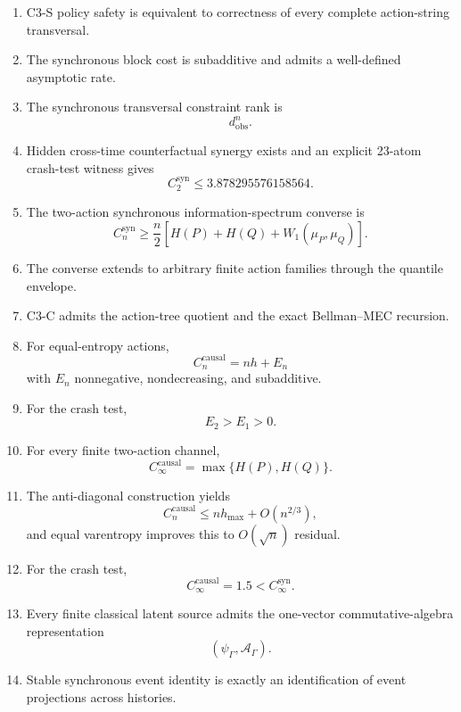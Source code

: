 \documentclass[11pt,a4paper]{article}
\newcommand{\Csyn}{C^{\mathrm{syn}}}
\newcommand{\Ccausal}{C^{\mathrm{causal}}}
\newcommand{\CinfSyn}{C_{\infty}^{\mathrm{syn}}}
\newcommand{\CinfCausal}{C_{\infty}^{\mathrm{causal}}}
\newcommand{\cA}{\mathcal A}
\newcommand{\1}{\mathbf 1}
\begin{document}
\begin{enumerate}[leftmargin=8mm]

\item C3-S policy safety is equivalent to correctness of every complete
action-string transversal.

\item The synchronous block cost is subadditive and admits a well-defined
asymptotic rate.

\item The synchronous transversal constraint rank is
\[
d_{\mathrm{obs}}^n.
\]

\item Hidden cross-time counterfactual synergy exists and an explicit
23-atom crash-test witness gives
\[
\Csyn_2
\le
3.878295576158564.
\]

\item The two-action synchronous information-spectrum converse is
\[
\Csyn_n
\ge
\frac n2
[
H(P)+H(Q)+W_1(\mu_P,\mu_Q)
].
\]

\item The converse extends to arbitrary finite action families through
the quantile envelope.

\item C3-C admits the action-tree quotient and the exact Bellman--MEC
recursion.

\item For equal-entropy actions,
\[
\Ccausal_n=nh+E_n
\]
with \(E_n\) nonnegative, nondecreasing, and subadditive.

\item For the crash test,
\[
E_2>E_1>0.
\]

\item For every finite two-action channel,
\[
\boxed{
\CinfCausal
=
\max\{H(P),H(Q)\}.
}
\]

\item The anti-diagonal construction yields
\[
\Ccausal_n
\le
nh_{\max}+O(n^{2/3}),
\]
and equal varentropy improves this to \(O(\sqrt n)\) residual.

\item For the crash test,
\[
\boxed{
\CinfCausal=1.5<\CinfSyn.
}
\]

\item Every finite classical latent source admits the one-vector
commutative-algebra representation
\[
(\psi_\Gamma,\cA_\Gamma).
\]

\item Stable synchronous event identity is exactly an identification of
event projections across histories.


\end{enumerate}
\end{document}

